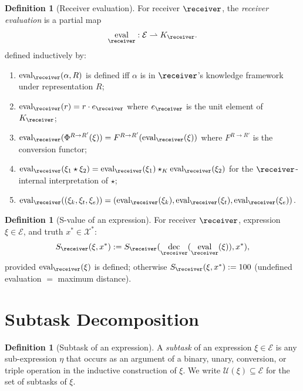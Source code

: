 \documentclass[11pt,a4paper]{article}
\theoremstyle{thmstyle}
\theoremstyle{thmstyle}
\theoremstyle{definition}
\newtheorem{definition}[theorem]{Definition}
\theoremstyle{remark}
\DeclareMathOperator{\eval}{eval}
\DeclareMathOperator{\dec}{dec}
\newcommand{\Truth}{\mathcal{X}^{*}}
\newcommand{\Expr}{\mathcal{E}}
\newcommand{\Sub}{\mathcal{U}}
\newcommand{\Sscalar}{S}
\begin{document}
\begin{definition}[Receiver evaluation]\label{def:eval}
For receiver $\receiver$, the \emph{receiver evaluation}
is a partial map
\[
\eval_{\receiver} : \Expr \rightharpoonup K_{\receiver}.
\]
defined inductively by:
\begin{enumerate}[nosep,label=(\arabic*)]
\item $\eval_{\receiver}(\alpha, R)$ is defined iff
      $\alpha$ is in $\receiver$'s knowledge framework
      under representation $R$;
\item $\eval_{\receiver}(r) = r \cdot e_{\receiver}$
      where $e_{\receiver}$ is the unit element of
      $K_{\receiver}$;
\item $\eval_{\receiver}(\Phi^{R \to R'}(\xi)) =
      F^{R \to R'}(\eval_{\receiver}(\xi))$ where
      $F^{R \to R'}$ is the conversion functor;
\item $\eval_{\receiver}(\xi_{1} \star \xi_{2}) =
      \eval_{\receiver}(\xi_{1}) \star_{K}
      \eval_{\receiver}(\xi_{2})$ for the
      $\receiver$-internal interpretation of $\star$;
\item $\eval_{\receiver}((\xi_{k}, \xi_{t}, \xi_{e}))
      = (\eval_{\receiver}(\xi_{k}),
         \eval_{\receiver}(\xi_{t}),
         \eval_{\receiver}(\xi_{e}))$.
\end{enumerate}
\end{definition}

\begin{definition}[S-value of an expression]\label{def:s-value-exp}
For receiver $\receiver$, expression $\xi \in \Expr$,
and truth $x^{*} \in \Truth$:
\[
\Sscalar_{\receiver}(\xi, x^{*})
:= \Sscalar_{\receiver}(\dec_{\receiver}(\eval_{\receiver}(\xi)), x^{*}),
\]
provided $\eval_{\receiver}(\xi)$ is defined; otherwise
$\Sscalar_{\receiver}(\xi, x^{*}) := 100$
(undefined evaluation $=$ maximum distance).
\end{definition}

\section{Subtask Decomposition}
\label{sec:subtask-decomposition}

\begin{definition}[Subtask of an expression]\label{def:subtask}
A \emph{subtask} of an expression $\xi \in \Expr$ is any
sub-expression $\eta$ that occurs as an argument of a
binary, unary, conversion, or triple operation in the
inductive construction of $\xi$.  We write
$\Sub(\xi) \subseteq \Expr$ for the set of subtasks of
$\xi$.
\end{definition}
\end{document}
